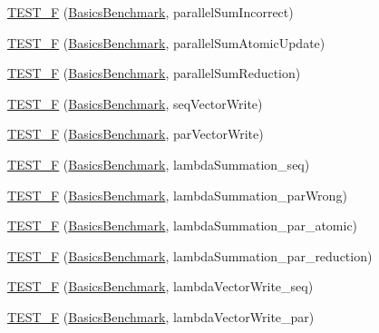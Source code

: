 \begin{DoxyCompactItemize}
\item 
\hyperlink{namespace_networ_kit_a12fc6da36d3dd1153a231e29b89ff862}{T\-E\-S\-T\-\_\-\-F} (\hyperlink{class_networ_kit_1_1_basics_benchmark}{Basics\-Benchmark}, parallel\-Sum\-Incorrect)
\item 
\hyperlink{namespace_networ_kit_afc036b6f174e2b06a52aca2d4b10d7de}{T\-E\-S\-T\-\_\-\-F} (\hyperlink{class_networ_kit_1_1_basics_benchmark}{Basics\-Benchmark}, parallel\-Sum\-Atomic\-Update)
\item 
\hyperlink{namespace_networ_kit_a95bf11f85605236d2f128edede2cfbd2}{T\-E\-S\-T\-\_\-\-F} (\hyperlink{class_networ_kit_1_1_basics_benchmark}{Basics\-Benchmark}, parallel\-Sum\-Reduction)
\item 
\hyperlink{namespace_networ_kit_a5b680dda57b4da22f8475528748fb4ca}{T\-E\-S\-T\-\_\-\-F} (\hyperlink{class_networ_kit_1_1_basics_benchmark}{Basics\-Benchmark}, seq\-Vector\-Write)
\item 
\hyperlink{namespace_networ_kit_afd8f5eb0c62ed8ed2b6783f0304c15b0}{T\-E\-S\-T\-\_\-\-F} (\hyperlink{class_networ_kit_1_1_basics_benchmark}{Basics\-Benchmark}, par\-Vector\-Write)
\item 
\hyperlink{namespace_networ_kit_aafb7e9dd6a69e2661b9c2df98572b6ce}{T\-E\-S\-T\-\_\-\-F} (\hyperlink{class_networ_kit_1_1_basics_benchmark}{Basics\-Benchmark}, lambda\-Summation\-\_\-seq)
\item 
\hyperlink{namespace_networ_kit_a1fe9a0794fb8a53a6ca8da14bac83b7b}{T\-E\-S\-T\-\_\-\-F} (\hyperlink{class_networ_kit_1_1_basics_benchmark}{Basics\-Benchmark}, lambda\-Summation\-\_\-par\-Wrong)
\item 
\hyperlink{namespace_networ_kit_a19992a5d9a24ed5a5b7d71b6de317b3b}{T\-E\-S\-T\-\_\-\-F} (\hyperlink{class_networ_kit_1_1_basics_benchmark}{Basics\-Benchmark}, lambda\-Summation\-\_\-par\-\_\-atomic)
\item 
\hyperlink{namespace_networ_kit_a51ed91c38314e4be58d3529bcd16a997}{T\-E\-S\-T\-\_\-\-F} (\hyperlink{class_networ_kit_1_1_basics_benchmark}{Basics\-Benchmark}, lambda\-Summation\-\_\-par\-\_\-reduction)
\item 
\hyperlink{namespace_networ_kit_a66a4d947cf9afac020e849d49e34e341}{T\-E\-S\-T\-\_\-\-F} (\hyperlink{class_networ_kit_1_1_basics_benchmark}{Basics\-Benchmark}, lambda\-Vector\-Write\-\_\-seq)
\item 
\hyperlink{namespace_networ_kit_a84c2c9ba58ae9af58ad54baa96d43cdf}{T\-E\-S\-T\-\_\-\-F} (\hyperlink{class_networ_kit_1_1_basics_benchmark}{Basics\-Benchmark}, lambda\-Vector\-Write\-\_\-par)
\end{DoxyCompactItemize}



